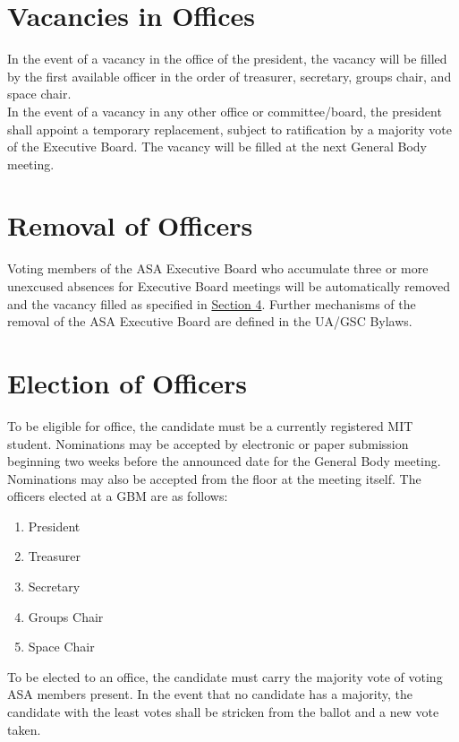 \documentclass[12pt]{article}
\begin{document}
\section{Vacancies in Offices}
\label{art:IV_sect4}
In the event of a vacancy in the office of the president, the vacancy will be filled by the first available
officer in the order of treasurer, secretary, groups chair, and space chair.
\\

In the event of a vacancy in any other office or committee/board, the president shall appoint a
temporary replacement, subject to ratification by a majority vote of the Executive Board. The vacancy
will be filled at the next General Body meeting.

\section{Removal of Officers}
Voting members of the ASA Executive Board who accumulate three or more unexcused absences for
Executive Board meetings will be automatically removed and the vacancy filled as specified in \hyperref[art:IV_sect4]{Section
4}.
Further mechanisms of the removal of the ASA Executive Board are defined in the UA/GSC Bylaws.

\section{Election of Officers}
\label{art:IV_sect6}
To be eligible for office, the candidate must be a currently registered MIT student. Nominations may
be accepted by electronic or paper submission beginning two weeks before the announced date for
the General Body meeting. Nominations may also be accepted from the floor at the meeting itself.
The officers elected at a GBM are as follows:
\begin{enumerate}
    \item President
    \item Treasurer
    \item Secretary
    \item Groups Chair
    \item Space Chair
\end{enumerate}
To be elected to an office, the candidate must carry the majority vote of voting ASA members present.
In the event that no candidate has a majority, the candidate with the least votes shall be stricken from
the ballot and a new vote taken.
\\
\end{document}
